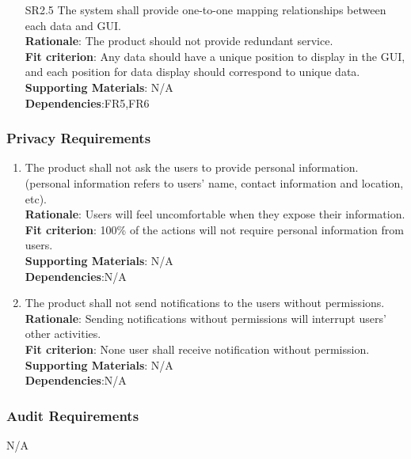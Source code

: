 \documentclass{article}
\begin{document}
\begin{enumerate}[SR2.1]
    \item[SR2.5] The system shall provide one-to-one
     mapping relationships between each data and GUI.\\
     \textbf{Rationale}: The product should not provide redundant service.  \\
     \textbf{Fit criterion}: Any data should have a unique position to display in the GUI, and each position for data display should correspond to unique data.\\
\textbf{Supporting Materials}: N/A\\
\textbf{Dependencies}:FR5,FR6\\

\end{enumerate}
\subsubsection{Privacy Requirements}
\begin{enumerate}[SR3.1]
\item The product shall not ask the users to provide personal 
information. (personal information refers to users' name, 
contact information and location, etc).\\
\textbf{Rationale}: Users will feel uncomfortable when they expose their information.\\
\textbf{Fit criterion}: 100\% of the actions will not require personal information from users.\\
\textbf{Supporting Materials}: N/A\\
\textbf{Dependencies}:N/A\\

    \item The product shall not send notifications to the users 
    without permissions.\\
    \textbf{Rationale}: Sending notifications without permissions will
    interrupt users' other activities.\\
    \textbf{Fit criterion}: None user shall receive notification without permission.\\
\textbf{Supporting Materials}: N/A\\
\textbf{Dependencies}:N/A\\

\end{enumerate}
\subsubsection{Audit Requirements}
 N/A
\end{document}
